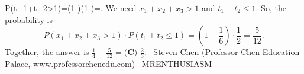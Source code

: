 \documentclass[12pt]{article}
\begin{document}
P(t_1+t_2>1)=\left(1-\right)\cdot\left(1-\right)=.\] We need $x_1+x_2+x_3>1$ and $t_1+t_2\leq1.$ So, the probability is \[P(x_1+x_2+x_3>1)\cdot P(t_1+t_2\leq1)=\left(1-\frac16\right)\cdot\frac12=\frac{5}{12}.\] Together, the answer is $\frac14 + \frac{5}{12} = \boxed{\textbf{(C) }\frac{2}{3}}.$ ~Steven Chen (Professor Chen Education Palace, www.professorchenedu.com) ~MRENTHUSIASM
\end{document}

